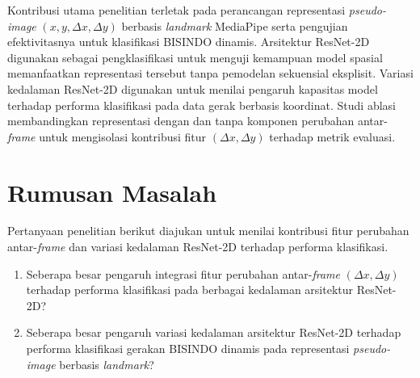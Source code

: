 Kontribusi utama penelitian terletak pada perancangan representasi \textit{pseudo-image} $(x, y, \Delta x, \Delta y)$ berbasis \textit{landmark} MediaPipe serta pengujian efektivitasnya untuk klasifikasi BISINDO dinamis.
Arsitektur ResNet-2D digunakan sebagai pengklasifikasi untuk menguji kemampuan model spasial memanfaatkan representasi tersebut tanpa pemodelan sekuensial eksplisit.
Variasi kedalaman ResNet-2D digunakan untuk menilai pengaruh kapasitas model terhadap performa klasifikasi pada data gerak berbasis koordinat.
Studi ablasi membandingkan representasi dengan dan tanpa komponen perubahan antar-\textit{frame} untuk mengisolasi kontribusi fitur $(\Delta x, \Delta y)$ terhadap metrik evaluasi.


\section{Rumusan Masalah} \label{sec:rumusan-masalah}
Pertanyaan penelitian berikut diajukan untuk menilai kontribusi fitur perubahan antar-\textit{frame} dan variasi kedalaman ResNet-2D terhadap performa klasifikasi.
\begin{enumerate}[noitemsep]
    \item Seberapa besar pengaruh integrasi fitur perubahan antar-\textit{frame} $(\Delta x, \Delta y)$ terhadap performa klasifikasi pada berbagai kedalaman arsitektur ResNet-2D?
    \item Seberapa besar pengaruh variasi kedalaman arsitektur ResNet-2D terhadap performa klasifikasi gerakan BISINDO dinamis pada representasi \textit{pseudo-image} berbasis \textit{landmark}?
\end{enumerate}

